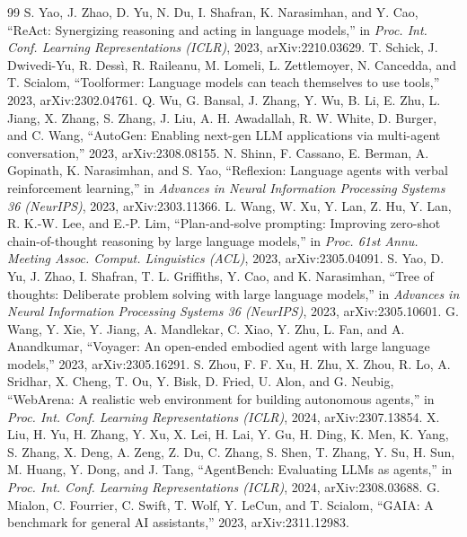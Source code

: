\documentclass[conference]{IEEEtran}
\begin{document}
\begin{thebibliography}{99}
 S. Yao, J. Zhao, D. Yu, N. Du, I. Shafran, K. Narasimhan, and Y. Cao, ``ReAct: Synergizing reasoning and acting in language models,'' in \emph{Proc. Int. Conf. Learning Representations (ICLR)}, 2023, arXiv:2210.03629.
 T. Schick, J. Dwivedi-Yu, R. Dess\`{i}, R. Raileanu, M. Lomeli, L. Zettlemoyer, N. Cancedda, and T. Scialom, ``Toolformer: Language models can teach themselves to use tools,'' 2023, arXiv:2302.04761.
 Q. Wu, G. Bansal, J. Zhang, Y. Wu, B. Li, E. Zhu, L. Jiang, X. Zhang, S. Zhang, J. Liu, A. H. Awadallah, R. W. White, D. Burger, and C. Wang, ``AutoGen: Enabling next-gen LLM applications via multi-agent conversation,'' 2023, arXiv:2308.08155.
 N. Shinn, F. Cassano, E. Berman, A. Gopinath, K. Narasimhan, and S. Yao, ``Reflexion: Language agents with verbal reinforcement learning,'' in \emph{Advances in Neural Information Processing Systems 36 (NeurIPS)}, 2023, arXiv:2303.11366.
 L. Wang, W. Xu, Y. Lan, Z. Hu, Y. Lan, R. K.-W. Lee, and E.-P. Lim, ``Plan-and-solve prompting: Improving zero-shot chain-of-thought reasoning by large language models,'' in \emph{Proc. 61st Annu. Meeting Assoc. Comput. Linguistics (ACL)}, 2023, arXiv:2305.04091.
 S. Yao, D. Yu, J. Zhao, I. Shafran, T. L. Griffiths, Y. Cao, and K. Narasimhan, ``Tree of thoughts: Deliberate problem solving with large language models,'' in \emph{Advances in Neural Information Processing Systems 36 (NeurIPS)}, 2023, arXiv:2305.10601.
 G. Wang, Y. Xie, Y. Jiang, A. Mandlekar, C. Xiao, Y. Zhu, L. Fan, and A. Anandkumar, ``Voyager: An open-ended embodied agent with large language models,'' 2023, arXiv:2305.16291.
 S. Zhou, F. F. Xu, H. Zhu, X. Zhou, R. Lo, A. Sridhar, X. Cheng, T. Ou, Y. Bisk, D. Fried, U. Alon, and G. Neubig, ``WebArena: A realistic web environment for building autonomous agents,'' in \emph{Proc. Int. Conf. Learning Representations (ICLR)}, 2024, arXiv:2307.13854.
 X. Liu, H. Yu, H. Zhang, Y. Xu, X. Lei, H. Lai, Y. Gu, H. Ding, K. Men, K. Yang, S. Zhang, X. Deng, A. Zeng, Z. Du, C. Zhang, S. Shen, T. Zhang, Y. Su, H. Sun, M. Huang, Y. Dong, and J. Tang, ``AgentBench: Evaluating LLMs as agents,'' in \emph{Proc. Int. Conf. Learning Representations (ICLR)}, 2024, arXiv:2308.03688.
 G. Mialon, C. Fourrier, C. Swift, T. Wolf, Y. LeCun, and T. Scialom, ``GAIA: A benchmark for general AI assistants,'' 2023, arXiv:2311.12983.

\end{thebibliography}
\end{document}
